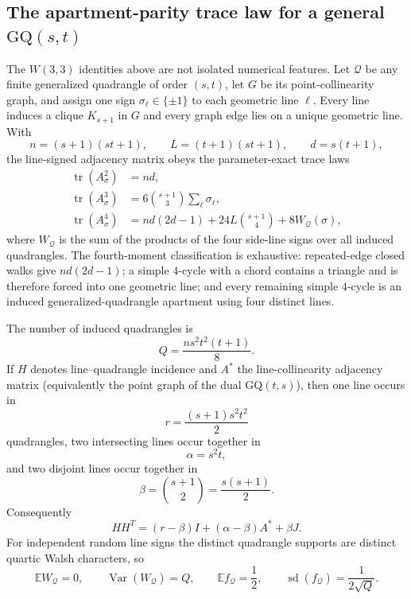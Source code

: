 \subsection{The apartment-parity trace law for a general $\mathrm{GQ}(s,t)$}
\label{sec:pass4465-general-gq-line-signing}

The $W(3,3)$ identities above are not isolated numerical features.  Let
$\mathcal Q$ be any finite generalized quadrangle of order $(s,t)$, let $G$ be
its point-collinearity graph, and assign one sign $\sigma_\ell\in\{\pm1\}$ to
each geometric line $\ell$.  Every line induces a clique $K_{s+1}$ in $G$ and
every graph edge lies on a unique geometric line.  With
\[
 n=(s+1)(st+1),\qquad
 L=(t+1)(st+1),\qquad
 d=s(t+1),
\]
the line-signed adjacency matrix obeys the parameter-exact trace laws
\begin{align}
 \operatorname{tr}(A_\sigma^2)
   &=nd,\\
 \operatorname{tr}(A_\sigma^3)
   &=6\binom{s+1}{3}\sum_{\ell}\sigma_\ell,\\
 \operatorname{tr}(A_\sigma^4)
   &=nd(2d-1)+24L\binom{s+1}{4}+8W_{\mathcal Q}(\sigma),
 \label{eq:pass4465-general-traces}
\end{align}
where $W_{\mathcal Q}$ is the sum of the products of the four side-line signs
over all induced quadrangles.  The fourth-moment classification is exhaustive:
repeated-edge closed walks give $nd(2d-1)$; a simple $4$-cycle with a chord
contains a triangle and is therefore forced into one geometric line; and every
remaining simple $4$-cycle is an induced generalized-quadrangle apartment using
four distinct lines.

The number of induced quadrangles is
\begin{equation}
 \boxed{
 Q=\frac{n s^2 t^2(t+1)}{8}.}
 \label{eq:pass4465-general-Q}
\end{equation}
If $H$ denotes line--quadrangle incidence and $A^\ast$ the line-collinearity
adjacency matrix (equivalently the point graph of the dual $\mathrm{GQ}(t,s)$),
then one line occurs in
\[
 r=\frac{(s+1)s^2t^2}{2}
\]
quadrangles, two intersecting lines occur together in
\[
 \alpha=s^2t,
\]
and two disjoint lines occur together in
\[
 \beta=\binom{s+1}{2}=\frac{s(s+1)}2.
\]
Consequently
\begin{equation}
 \boxed{
 HH^T=(r-\beta)I+(\alpha-\beta)A^\ast+\beta J.}
 \label{eq:pass4465-general-gram}
\end{equation}
For independent random line signs the distinct quadrangle supports are distinct
quartic Walsh characters, so
\[
 \mathbb E W_{\mathcal Q}=0,
 \qquad
 \operatorname{Var}(W_{\mathcal Q})=Q,
 \qquad
 \mathbb E f_{\mathcal Q}=\frac12,
 \qquad
 \operatorname{sd}(f_{\mathcal Q})=\frac1{2\sqrt Q}.
\]

